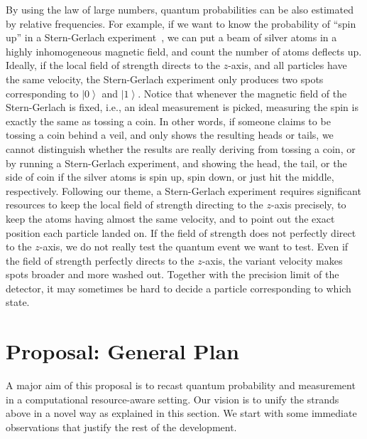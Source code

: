 \documentclass{article}
\theoremstyle{remark}
\newcommand{\ket}[1]{{\left\vert{#1}\right\rangle}}
\begin{document}
By using the law of large numbers, quantum probabilities can be also
estimated by relative frequencies. For example, if we want to know the
probability of ``spin up'' in a Stern-Gerlach
experiment~\cite{Stern1988,peres1995quantum,544199,Griffiths2003}, we
can put a beam of silver atoms in a highly inhomogeneous magnetic
field, and count the number of atoms deflects up. Ideally, if the
local field of strength directs to the $z$-axis, and all particles
have the same velocity, the Stern-Gerlach experiment only produces two
spots corresponding to $\ket{0}$ and $\ket{1}$. Notice that whenever
the magnetic field of the Stern-Gerlach is fixed, i.e., an ideal
measurement is picked, measuring the spin is exactly the same as
tossing a coin. In other words, if someone claims to be tossing a coin
behind a veil, and only shows the resulting heads or tails, we cannot
distinguish whether the results are really deriving from tossing a
coin, or by running a Stern-Gerlach experiment, and showing the head,
the tail, or the side of coin if the silver atoms is spin up, spin
down, or just hit the middle, respectively. Following our theme, a
Stern-Gerlach experiment requires significant resources to keep the
local field of strength directing to the $z$-axis precisely, to keep
the atoms having almost the same velocity, and to point out the exact
position each particle landed on. If the field of strength does not
perfectly direct to the $z$-axis, we do not really test the quantum
event we want to test. Even if the field of strength perfectly directs
to the $z$-axis, the variant velocity makes spots broader and more
washed out. Together with the precision limit of the detector, it may
sometimes be hard to decide a particle corresponding to which state.

\section{Proposal: General Plan} 

A major aim of this proposal is to recast quantum probability and
measurement in a computational resource-aware setting. Our vision is
to unify the strands above in a novel way as explained in this
section. We start with some immediate observations that justify the
rest of the development. 
\end{document}
